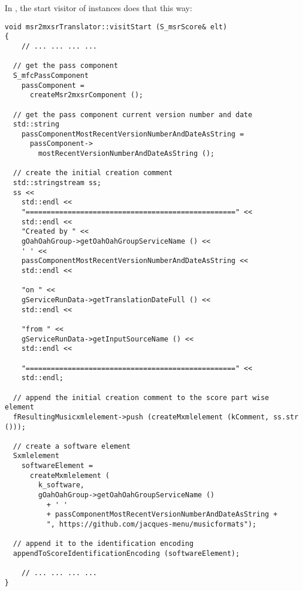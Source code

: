 In , the start visitor of  instances does that this way:
\begin{lstlisting}[language=CPlusPlus]
void msr2mxsrTranslator::visitStart (S_msrScore& elt)
{
 	// ... ... ... ...

  // get the pass component
  S_mfcPassComponent
    passComponent =
      createMsr2mxsrComponent ();

  // get the pass component current version number and date
  std::string
    passComponentMostRecentVersionNumberAndDateAsString =
      passComponent->
        mostRecentVersionNumberAndDateAsString ();

  // create the initial creation comment
  std::stringstream ss;
  ss <<
    std::endl <<
    "==================================================" <<
    std::endl <<
    "Created by " <<
    gOahOahGroup->getOahOahGroupServiceName () <<
    ' ' <<
    passComponentMostRecentVersionNumberAndDateAsString <<
    std::endl <<

    "on " <<
    gServiceRunData->getTranslationDateFull () <<
    std::endl <<

    "from " <<
    gServiceRunData->getInputSourceName () <<
    std::endl <<

    "==================================================" <<
    std::endl;

  // append the initial creation comment to the score part wise element
  fResultingMusicxmlelement->push (createMxmlelement (kComment, ss.str ()));

  // create a software element
  Sxmlelement
    softwareElement =
      createMxmlelement (
        k_software,
        gOahOahGroup->getOahOahGroupServiceName ()
          + ' '
          + passComponentMostRecentVersionNumberAndDateAsString +
          ", https://github.com/jacques-menu/musicformats");

  // append it to the identification encoding
  appendToScoreIdentificationEncoding (softwareElement);

 	// ... ... ... ...
}
\end{lstlisting}

